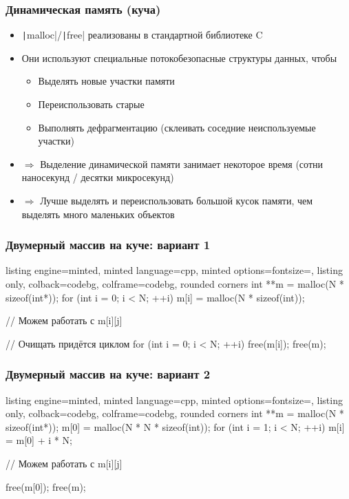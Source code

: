 \documentclass[10pt]{beamer}
\begin{document}
\begin{frame}[fragile]
\frametitle{Динамическая память (куча)}
\begin{itemize}
\item \texttt|malloc|/\texttt|free| реализованы в стандартной библиотеке C
\pause
\item Они используют специальные потокобезопасные структуры данных, чтобы
\begin{itemize}
\item Выделять новые участки памяти
\item Переиспользовать старые
\item Выполнять дефрагментацию (склеивать соседние неиспользуемые участки)
\end{itemize}
\pause
\item \(\Longrightarrow\) Выделение динамической памяти занимает некоторое время (сотни наносекунд / десятки микросекунд)
\pause
\item \(\Longrightarrow\) Лучше выделять и переиспользовать большой кусок памяти, чем выделять много маленьких объектов
\end{itemize}
\end{frame}

\begin{frame}[fragile]
\frametitle{Двумерный массив на куче: вариант 1}
\begin{tcblisting}{listing engine=minted, minted language=cpp, minted options={fontsize=\scriptsize}, listing only, colback=codebg, colframe=codebg, rounded corners}
int **m = malloc(N * sizeof(int*));
for (int i = 0; i < N; ++i)
  m[i] = malloc(N * sizeof(int));

// Можем работать с m[i][j]

// Очищать придётся циклом
for (int i = 0; i < N; ++i)
  free(m[i]);
free(m);
\end{tcblisting}
\end{frame}

\begin{frame}[fragile]
\frametitle{Двумерный массив на куче: вариант 2}
\begin{tcblisting}{listing engine=minted, minted language=cpp, minted options={fontsize=\scriptsize}, listing only, colback=codebg, colframe=codebg, rounded corners}
int **m = malloc(N * sizeof(int*));
m[0] = malloc(N * N * sizeof(int));
for (int i = 1; i < N; ++i)
  m[i] = m[0] + i * N;

// Можем работать с m[i][j]

free(m[0]);
free(m);
\end{tcblisting}
\end{frame}
\end{document}
